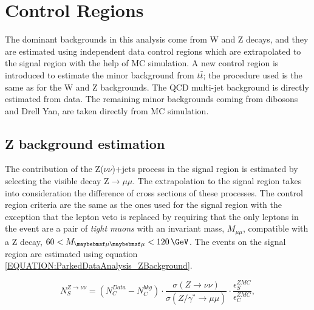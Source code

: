 \section{Control Regions}
\label{SECTION:ParkedDataAnalysis_ControlRegions}


The dominant backgrounds in this analysis come from W and Z decays, and they are estimated using independent data control regions which are extrapolated to the signal region with the help of \gls{MC} simulation. A new control region is introduced to estimate the minor background from $t\bar{t}$; the procedure used is the same as for the W and Z backgrounds. The \gls{QCD} multi-jet background is directly estimated from data. The remaining minor backgrounds coming from dibosons and Drell Yan, are taken directly from \gls{MC} simulation.

\subsection{Z background estimation}
\label{SECTION:ParkedDataAnalysis_ControlRegions_ZBackground}


The contribution of the Z($\nu\nu$)+jets process in the signal region is estimated by selecting the visible decay Z$\rightarrow\mu\mu$. The extrapolation to the signal region takes into consideration the difference of cross sections of these processes. The control region criteria are the same as the ones used for the signal region with the exception that the lepton veto is replaced by requiring that the only leptons in the event are a pair of \textit{tight muons} with an invariant mass, $M_{\mu\mu}$, compatible with a Z decay, $60<M_{\mu\mu}<120\,\GeV$. The events on the signal region are estimated using equation \ref{EQUATION:ParkedDataAnalysis_ZBackground}.

\begin{equation}
N_{S}^{Z\rightarrow\nu\nu}=\left(N_{C}^{Data}-N_{C}^{bkg}\right) \cdot\frac{\sigma\left(Z\rightarrow\nu\nu\right)}{\sigma\left(Z/\gamma^{*}\rightarrow\mu\mu\right)}\cdot \frac{\epsilon_{S}^{ZMC}}{\epsilon_{C}^{ZMC}},
\label{EQUATION:ParkedDataAnalysis_ZBackground}
\end{equation}

